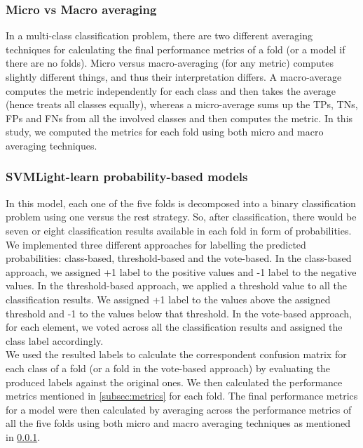         \subsubsection{Micro vs Macro averaging}
        \label{subsubsec:micromacro}
        In a multi-class classification problem, there are two different averaging techniques for calculating the final 
        performance metrics of a fold (or a model if there are no folds). Micro versus macro-averaging (for any metric) 
        computes slightly different things, and thus their interpretation differs. A macro-average computes the metric 
        independently for each class and then takes the average (hence treats all classes equally), whereas a micro-average 
        sums up the TPs, TNs, FPs and FNs from all the involved classes and then computes the metric. In this study,
        we computed the metrics for each fold using both micro and macro averaging techniques.\\

        \subsubsection{SVMLight-learn probability-based models}
        \label{subsub:svmmetrics}
        In this model, each one of the five folds is decomposed into a binary classification problem using one versus the rest 
        strategy. So, after classification, there would be seven or eight classification results available in each fold 
        in form of probabilities.\\

        We implemented three different approaches for labelling the predicted probabilities: class-based, threshold-based and 
        the vote-based. In the class-based approach, we assigned +1 label to the positive values and -1 label to the negative values. 
        In the threshold-based approach, we applied a threshold value to all the classification results. We assigned +1 label to the values 
        above the assigned threshold and -1 to the values below that threshold. In the vote-based approach, for each element, 
        we voted across all the classification results and assigned the class label accordingly.\\
        
        We used the resulted labels to calculate the correspondent confusion matrix for each class of a fold 
        (or a fold in the vote-based approach) by evaluating the produced labels against the original ones. 
        We then calculated the performance metrics mentioned in \ref{subsec:metrics} 
        for each fold. The final performance metrics for a model were then calculated by averaging across the performance metrics 
        of all the five folds using both micro and macro averaging techniques as mentioned in \ref{subsubsec:micromacro}.\\


